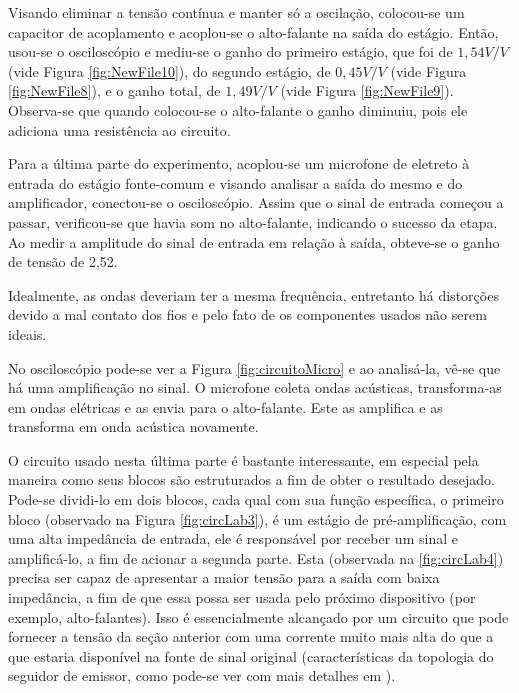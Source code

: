 \documentclass{article}
\begin{document}
        Visando eliminar a tensão contínua e manter só a oscilação, colocou-se um capacitor de acoplamento e acoplou-se o alto-falante na saída do estágio. Então, usou-se o osciloscópio e mediu-se o ganho do primeiro estágio, que foi de $1,54V/V$ (vide Figura \ref{fig:NewFile10}), do segundo estágio, de $0,45V/V$ (vide Figura \ref{fig:NewFile8}), e o ganho total, de $1,49V/V$ (vide Figura \ref{fig:NewFile9}). Observa-se que quando colocou-se o alto-falante o ganho diminuiu, pois ele adiciona uma resistência ao circuito.
        
        Para a última parte do experimento, acoplou-se um microfone de eletreto à entrada do estágio fonte-comum e visando analisar a saída do mesmo e do amplificador, conectou-se o osciloscópio. Assim que o sinal de entrada começou a passar, verificou-se que havia som no alto-falante, indicando o sucesso da etapa. Ao medir a amplitude do sinal de entrada em relação à saída, obteve-se o ganho de tensão de 2,52.
        
        Idealmente, as ondas deveriam ter a mesma frequência, entretanto há distorções devido a mal contato dos fios e pelo fato de os componentes usados não serem ideais.
        
        No osciloscópio pode-se ver a Figura \ref{fig:circuitoMicro} e ao analisá-la, vê-se que há uma amplificação no sinal. O microfone coleta ondas acústicas, transforma-as em ondas elétricas e as envia para o alto-falante. Este as amplifica e as transforma em onda acústica novamente.
        
        O circuito usado nesta última parte é bastante interessante, em especial pela maneira como seus blocos são estruturados a fim de obter o resultado desejado. Pode-se dividi-lo em dois blocos, cada qual com sua função específica, o primeiro bloco (observado na Figura \ref{fig:circLab3}), é um estágio de pré-amplificação, com uma alta impedância de entrada, ele é responsável por receber um sinal e amplificá-lo, a fim de acionar a segunda parte. Esta (observada na \ref{fig:circLab4}) precisa ser capaz de apresentar a maior tensão para a saída com baixa impedância, a fim de que essa possa ser usada pelo próximo dispositivo (por exemplo, alto-falantes). Isso é essencialmente alcançado por um circuito que pode fornecer a tensão da seção anterior com uma corrente muito mais alta do que a que estaria disponível na fonte de sinal original (características da topologia do seguidor de emissor, como pode-se ver com mais detalhes em \cite{Sedra2004}).
    
\end{document}
